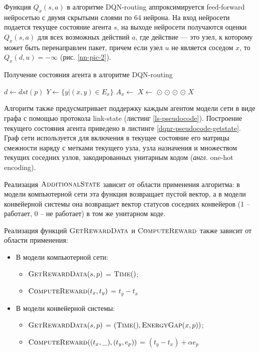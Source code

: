 \documentclass[specification,annotation,times]{itmo-student-thesis}
\theoremstyle{definition}
\begin{document}
Функция $Q_x(s, a)$ в алгоритме DQN-routing аппроксимируется feed-forward
нейросетью с двумя скрытыми слоями по 64 нейрона. На вход
нейросети подается текущее состояние агента $s$, на выходе нейросети получаются
оценки $Q_x(s, a)$ для всех возможных действий $a$, где действие --- это узел, к
которому может быть перенаправлен пакет, причем если узел $u$
не является соседом $x$, то $Q_x(d, u) = -\infty$ (рис. \ref{nn-pic-2}).

\begin{algorithm}[!h]
\caption{Получение состояния агента в алгоритме DQN-routing}
\label{dqnr-pseudocode-getstate}
\begin{algorithmic}[1]
    \State $d \gets dst(p)$ 
    \State $Y \gets \{ y | (x, y) \in E_x \}$ 
    \State $A_x \gets $   
    \State $X \gets $ 
    \State \Return {} $\odot$  $\odot$
     $\odot$  $\odot$ $X$
  \EndFunction
\end{algorithmic}
\end{algorithm}

Алгоритм также предусматривает поддержку каждым агентом модели сети в виде графа
с помощью протокола link-state (листинг \ref{ls-pseudocode}). Построение
текущего состояния агента приведено в листинге \ref{dqnr-pseudocode-getstate}.
Граф сети используется для включения в текущее состояние его матрицы смежности
наряду с метками текущего узла, узла назначения и множеством текущих соседних
узлов, закодированных унитарным кодом (\textit{англ.} one-hot encoding).

Реализация $\textsc{AdditionalState}$ зависит от области применения алгоритма: в
модели компьютерной сети эта функция возвращает пустой вектор, а в модели
конвейерной системы она возвращает вектор статусов соседних конвейеров (1 --
работает, 0 -- не работает) в том же унитарном коде.

Реализация функций $\textsc{GetRewardData}$ и $\textsc{ComputeReward}$ также
зависит от области применения:

\begin{itemize}
\item В модели компьютерной сети:
  \begin{itemize}
  \item $\textsc{GetRewardData}(s, p)$ = $\textsc{Time}()$;
  \item $\textsc{ComputeReward}(t_x, t_y)$ = $t_y - t_x$
  \end{itemize}
\item В модели конвейерной системы:
  \begin{itemize}
  \item $\textsc{GetRewardData}(s, p)$ = $(\textsc{Time}(), \textsc{EnergyGap}(x, p))$;
  \item $\textsc{ComputeReward}((t_x, \_), (t_y, e_p))$ = $(t_y - t_x) + \alpha e_p$
  \end{itemize}
\end{itemize}
\end{document}
